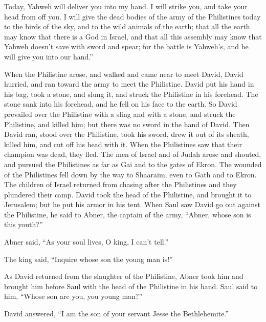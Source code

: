 {Today, Yahweh will deliver you into my hand. I will strike you, and take your head from off you. I will give the dead bodies of the army of the Philistines today to the birds of the sky, and to the wild animals of the earth; that all the earth may know that there is a God in Israel,
and that all this assembly may know that Yahweh doesn’t save with sword and spear; for the battle is Yahweh’s, and he will give you into our hand.”
\par }{\PP {}When the Philistine arose, and walked and came near to meet David, David hurried, and ran toward the army to meet the Philistine.
David put his hand in his bag, took a stone, and slung it, and struck the Philistine in his forehead. The stone sank into his forehead, and he fell on his face to the earth.
So David prevailed over the Philistine with a sling and with a stone, and struck the Philistine, and killed him; but there was no sword in the hand of David.
Then David ran, stood over the Philistine, took his sword, drew it out of its sheath, killed him, and cut off his head with it. When the Philistines saw that their champion was dead, they fled.
The men of Israel and of Judah arose and shouted, and pursued the Philistines as far as Gai and to the gates of Ekron. The wounded of the Philistines fell down by the way to Shaaraim, even to Gath and to Ekron.
The children of Israel returned from chasing after the Philistines and they plundered their camp.
David took the head of the Philistine, and brought it to Jerusalem; but he put his armor in his tent.
When Saul saw David go out against the Philistine, he said to Abner, the captain of the army, “Abner, whose son is this youth?”
\par }{\PP Abner said, “As your soul lives, O king, I can’t tell.”
\par }{\PP {}The king said, “Inquire whose son the young man is!”
\par }{\PP {}As David returned from the slaughter of the Philistine, Abner took him and brought him before Saul with the head of the Philistine in his hand.
Saul said to him, “Whose son are you, you young man?”
\par }{\PP David answered, “I am the son of your servant Jesse the Bethlehemite.”

}
